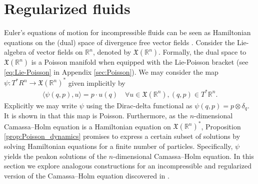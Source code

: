 \documentclass[12pt]{amsart}
\begin{document}
\section{Regularized fluids}
  Euler's equations of motion for incompressible fluids can be seen as
  Hamiltonian equations on the (dual) space of divergence
  free vector fields \cite{Arnold1966}.
  Consider the Lie-algebra of vector fields on $\mathbb{R}^n$, 
  denoted by $\mathfrak{X}(\mathbb{R}^n)$.
  Formally, the dual space to $\mathfrak{X}(\mathbb{R}^n)$ is a Poisson
  manifold when equipped with the Lie-Poisson bracket
  (see \eqref{eq:Lie-Poisson} in Appendix \ref{sec:Poisson}).
  We may consider the map
  $\psi: T^*R^n \to \mathfrak{X}(\mathbb{R}^n)^*$
  given implicitly by
  \begin{align*}
    \langle \psi(q,p) , u \rangle = p \cdot u(q) \quad
    \forall u \in \mathfrak{X}(\mathbb{R}^n), (q,p) \in T^*\mathbb{R}^n.
  \end{align*}
  Explicitly we may write $\psi$ using the Dirac-delta
  functional as $\psi(q,p) = p \otimes \delta_q$.
  It is shown in \cite{HolmMarsden2005} that this map is Poisson.
  Furthermore, as the $n$-dimensional Camassa--Holm equation \cite{CamassaHolm1993} is a
  Hamiltonian equation on $\mathfrak{X}(\mathbb{R}^n)^*$,
  Proposition \ref{prop:Poisson_dynamics} promises to express a 
  certain subset
  of solutions by solving Hamiltonian equations for a finite number
  of particles.
  Specifically, $\psi$ yields the peakon solutions of the $n$-dimensional
  Camassa--Holm equation.
  In this section we explore analogous constructions for
  an incompressible and regularized version of the
  Camassa--Holm equation discovered in \cite{MumfordMichor2013}.
\end{document}
